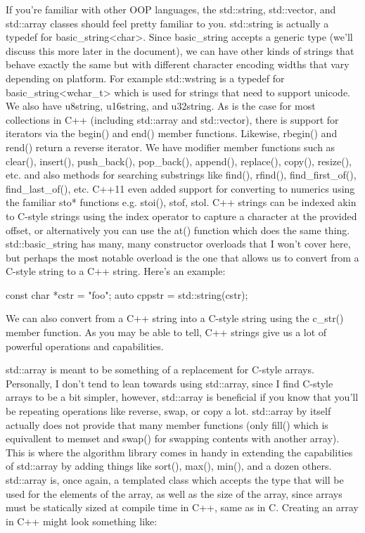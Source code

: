 \documentclass{article}
\begin{document}
If you're familiar with other OOP languages, the std::string, std::vector, and std::array classes should feel
pretty familiar to you. std::string is actually a typedef for basic\_string<char>. Since basic\_string accepts
a generic type (we'll discuss this more later in the document), we can have other kinds of strings that behave
exactly the same but with different character encoding widths that vary depending on platform. For example
std::wstring is a typedef for basic\_string<wchar\_t> which is used for strings that need to support unicode.
We also have u8string, u16string, and u32string. As is the case for most collections in C++ (including
std::array and std::vector), there is support for iterators via the begin() and end() member functions.
Likewise, rbegin() and rend() return a reverse iterator. We have modifier member functions such as clear(),
insert(), push\_back(), pop\_back(), append(), replace(), copy(), resize(), etc. and also methods for
searching substrings like find(), rfind(), find\_first\_of(), find\_last\_of(), etc. C++11 even added support
for converting to numerics using the familiar sto* functions e.g. stoi(), stof, stol. C++ strings can be
indexed akin to C-style strings using the index operator to capture a character at the provided offset, or
alternatively you can use the at() function which does the same thing. std::basic\_string has many, many
constructor overloads that I won’t cover here, but perhaps the most notable overload is the one that allows us
to convert from a C-style string to a C++ string. Here’s an example:

\begin{cpplst}
const char *cstr = "foo";
auto cppstr = std::string(cstr);
\end{cpplst}

We can also convert from a C++ string into a C-style string using the c\_str() member function. As you may be
able to tell, C++ strings give us a lot of powerful operations and capabilities.

std::array is meant to be something of a replacement for C-style arrays. Personally, I don’t tend to lean
towards using std::array, since I find C-style arrays to be a bit simpler, however, std::array is beneficial
if you know that you’ll be repeating operations like reverse, swap, or copy a lot. std::array by itself
actually does not provide that many member functions (only fill() which is equivallent to memset and swap()
for swapping contents with another array). This is where the algorithm library comes in handy in extending the
capabilities of std::array by adding things like sort(), max(), min(), and a dozen others. std::array is, once
again, a templated class which accepts the type that will be used for the elements of the array, as well as
the size of the array, since arrays must be statically sized at compile time in C++, same as in C. Creating an
array in C++ might look something like:
\end{document}

